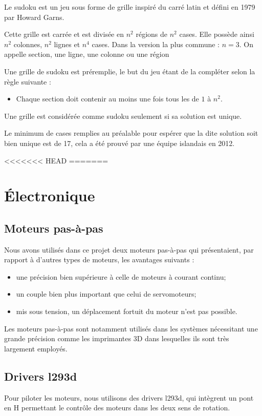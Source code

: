 \documentclass[12pt,a4paper]{report}
\begin{document}
	Le sudoku est un jeu sous forme de grille inspiré du carré latin et défini en 1979 par Howard Garns.
	
	Cette grille est carrée et est divisée en $n^2$ régions de $n^2$ cases. Elle possède ainsi $n^2$ colonnes, $n^2$ lignes et $n^4$ cases. Dans la version la plus commune : $n=3$. On appelle section, une ligne, une colonne ou une région

Une grille de sudoku est préremplie, le but du jeu étant de la compléter selon la règle suivante :
\begin{itemize}[label=--]
\item Chaque section doit contenir au moins une fois tous les de $1$ à $n^2$.
\end{itemize} 

Une grille est considérée comme sudoku seulement si sa solution est unique.

Le minimum de cases remplies au préalable pour espérer que la dite solution soit bien unique est de 17, cela a été prouvé par une équipe islandais en 2012.

<<<<<<< HEAD
=======
	\chapter{Électronique}
\section{Moteurs pas-à-pas}
\label{Elec_stepper}
Nous avons utilisés dans ce projet deux moteurs pas-à-pas qui présentaient, par rapport à d'autres types de moteurs, les avantages suivants : 
\begin{itemize}[label=--]
\item une précision bien supérieure à celle de moteurs à courant continu;
\item un couple bien plus important que celui de servomoteurs;
\item mis sous tension, un déplacement fortuit du moteur n'est pas possible.
\end{itemize}
Les moteurs pas-à-pas sont notamment utilisés dans les systèmes nécessitant une grande précision comme les imprimantes 3D dans lesquelles ils sont très largement employés.

\section{Drivers l293d}
Pour piloter les moteurs, nous utilisons des drivers l293d, qui intègrent un pont en H permettant le contrôle des moteurs dans les deux sens de rotation.
\end{document}
